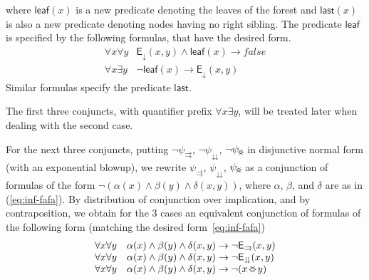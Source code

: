 \documentclass{CSML}
\newcommand\leaf{\mathsf{leaf}}
\newcommand\last{\mathsf{last}}
\newcommand\EE{\mathsf{E}}
\newcommand\PC{\EE_{\downarrow}}
\newcommand\SAD{\EE_{\downdownarrows}}
\newcommand\SFS{\EE_{\rightrightarrows}}
\renewcommand\parallel{\mathbin{\!<\mkern-12mu>\!}}
\begin{document}
where $\leaf(x)$ is a new predicate denoting the leaves of the forest and
$\last(x)$ is also a new predicate denoting nodes having no right sibling.  The
predicate $\leaf$ is specified by the following formulas, that have the desired form. 
\[
\begin{array}{ll}
\forall x \forall y & \PC(x,y) \land \leaf(x) \to \mathit{false}\\
\forall x \exists y & \lnot\leaf(x) \to \PC(x, y)
\end{array}
\]
Similar formulas specify the predicate $\last$.

\noindent
The first three conjuncts, with quantifier prefix $\forall x \exists y$, will be
treated later when dealing with the second case.

\noindent
For the next three conjuncts, putting $\neg\psi_{\rightrightarrows}$, $\neg \psi_{\downdownarrows}$, 
$\neg\psi_{\parallel}$ in disjunctive normal form 
(with an exponential blowup), 
we rewrite $\psi_{\rightrightarrows}$, $\psi_{\downdownarrows}$,
$\psi_{\parallel}$ as a conjunction of formulas of the form $\neg(\alpha(x)
\wedge \beta(y) \wedge \delta(x,y))$, 
where 
$\alpha$, $\beta$, and $\delta$ are as in (\ref{eq:inf-fafa}).
By distribution of conjunction over implication, and by contraposition, 
we obtain for the 3 cases an equivalent conjunction of formulas of the
following form (matching the desired form~\eqref{eq:inf-fafa}) 
\[
\begin{array}{ll}
\forall x \forall y & 
 \alpha(x) \wedge \beta(y) \wedge \delta(x,y) \to \neg \SFS(x, y)\\
\forall x \forall y & 
 \alpha(x) \wedge \beta(y) \wedge \delta(x,y) \to \neg \SAD(x, y)\\
\forall x \forall y & 
 \alpha(x) \wedge \beta(y) \wedge \delta(x,y) \to \neg (x \parallel y)\\
\end{array}
\]
\end{document}
